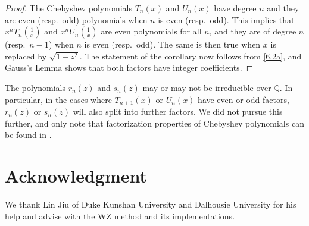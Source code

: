 \documentclass{amsart}
\theoremstyle{plain}
\numberwithin{equation}{section}
\begin{document}
\begin{proof}
The Chebyshev polynomials $T_n(x)$ and $U_n(x)$ have degree $n$ and they are
even (resp.\ odd) polynomials when $n$ is even (resp.\ odd). This implies that
$x^nT_n(\tfrac{1}{x})$ and $x^nU_n(\tfrac{1}{x})$ are even polynomials for all 
$n$, and they are
of degree $n$ (resp.\ $n-1$) when $n$ is even (resp.\ odd). The same is then
true when $x$ is replaced by $\sqrt{1-z^2}$. The statement of the corollary
now follows from \eqref{6.2a}, and Gauss's Lemma shows that both factors have
integer coefficients.
\end{proof}

The polynomials $r_n(z)$ and $s_n(z)$ may or may not be irreducible over 
$\mathbb Q$. In particular, in the cases where $T_{n+1}(x)$ or $U_n(x)$ have 
even or odd factors, $r_n(z)$ or $s_n(z)$ will also split into further factors.
We did not pursue this further, and only note that factorization properties of 
Chebyshev polynomials can be found in \cite[p.~220ff.]{Ri}.

\section*{Acknowledgment}

We thank Lin Jiu of Duke Kunshan University and Dalhousie University for his 
help and advise with the WZ method and its implementations. 
\end{document}
